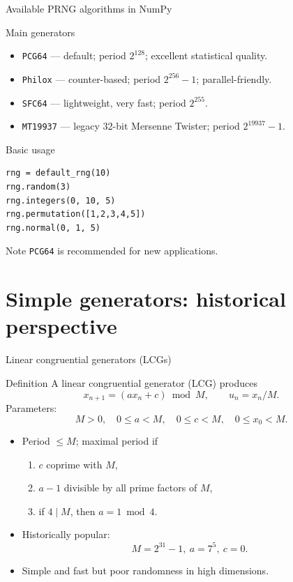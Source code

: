 \documentclass[aspectratio=169]{beamer}
\begin{document}
\begin{frame}[fragile]{Available PRNG algorithms in NumPy}
\begin{block}{Main generators}
\begin{itemize}
  \item \texttt{PCG64} — default; period \(2^{128}\); excellent statistical quality.
  \item \texttt{Philox} — counter-based; period \(2^{256}-1\); parallel-friendly.
  \item \texttt{SFC64} — lightweight, very fast; period \(2^{255}\).
  \item \texttt{MT19937} — legacy 32-bit Mersenne Twister; period \(2^{19937}-1\).
\end{itemize}
\end{block}

\begin{block}{Basic usage}
\begin{lstlisting}[frame=none,numbers=none]
rng = default_rng(10)
rng.random(3)
rng.integers(0, 10, 5)
rng.permutation([1,2,3,4,5])
rng.normal(0, 1, 5)
\end{lstlisting}
\end{block}

\begin{block}{Note}
\texttt{PCG64} is recommended for new applications.
\end{block}
\end{frame}




\section{Simple generators: historical perspective}

\begin{frame}{Linear congruential generators (LCGs)}
\begin{block}{Definition}
A linear congruential generator (LCG) produces
\[
x_{n+1} = (a x_n + c) \bmod M, \qquad
u_n = x_n / M.
\]
Parameters:
\[
M>0,\quad 0\le a<M,\quad 0\le c<M,\quad 0\le x_0<M.
\]
\end{block}

\begin{itemize}
  \item Period $\le M$; maximal period if
    \begin{enumerate}
      \item $c$ coprime with $M$,
      \item $a-1$ divisible by all prime factors of $M$,
      \item if $4\mid M$, then $a=1\bmod 4$.
    \end{enumerate}
  \item Historically popular:
    \[
      M=2^{31}-1,\ a=7^5,\ c=0.
    \]
  \item Simple and fast but poor randomness in high dimensions.
\end{itemize}
\end{frame}
\end{document}
